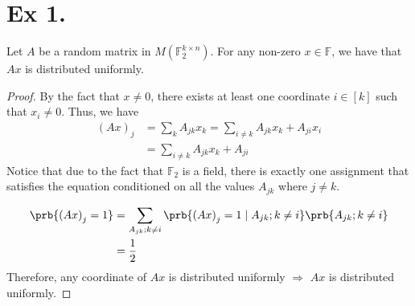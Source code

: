 \documentclass{article}
\newcommand{\FF}{\mathbb{F}}
\begin{document}
%
%
%
\section{Ex 1.}
Let $A$ be a random matrix in $M(\mathbb{F}_{2}^{k\times n})$. For any non-zero $x \in \FF$, we have that $Ax$ is distributed uniformly.
\begin{claim}
\end{claim}
\begin{proof}
By the fact that $x \neq 0$, there exists at least one coordinate $i \in [k]$ such that $x_i \neq 0$. Thus, we have
\begin{equation*}
    \begin{split}    
        \left( Ax \right)_{j} &= \sum_{k}{A_{jk}x_{k}} = \sum_{i \neq k}{A_{jk}x_{k}}  + A_{ji}x_{i} \\ 
        & =  \sum_{i \neq k}{A_{jk}x_{k}}  + A_{ji}
      \end{split}
\end{equation*}
Notice that due to the fact that $\FF_{2}$ is a field, there is exactly one assignment that satisfies the equation conditioned on all the values $A_{jk}$ where $j \neq k$.    

\begin{equation*}
    \begin{split}
      \prb{\left( Ax \right)_{j} = 1} &=  \sum_{ A_{jk}; k\neq i   }{\prb{\left( Ax \right)_{j} = 1 \mid A_{jk} ; k\neq i }\prb{ A_{jk} ; k\neq i }}  \\
      &= \frac{1}{2} 
    \end{split}
\end{equation*}
Therefore, any coordinate of $Ax$ is distributed uniformly $\Rightarrow$ $Ax$ is distributed uniformly. 
\end{proof}
\end{document}
